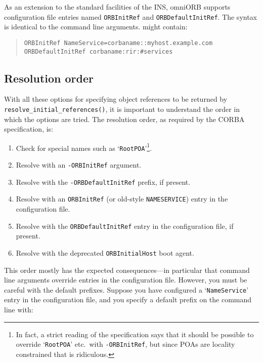 \documentclass[11pt,twoside,a4paper]{book}
\newcommand{\op}[1]{\texttt{#1()}}
\newcommand{\cmdline}[1]{\texttt{#1}}
\newcommand{\file}{\begingroup \urlstyle{tt}\Url}
\newcommand{\dsc}{\discretionary{}{}{}}
\begin{document}
As an extension to the standard facilities of the INS, omniORB
supports configuration file entries named \texttt{ORBInitRef} and
\texttt{ORBDefaultInitRef}. The syntax is identical to the command
line arguments. \file{omniORB.cfg} might contain:

\begin{quote}
\begin{verbatim}
ORBInitRef NameService=corbaname::myhost.example.com
ORBDefaultInitRef corbaname:rir:#services
\end{verbatim}
\end{quote}


\subsection{Resolution order}

With all these options for specifying object references to be returned
by \op{resolve\_\dsc{}initial\_references}, it is important to
understand the order in which the options are tried. The resolution
order, as required by the CORBA specification, is:

\begin{enumerate}

\item Check for special names such as `\texttt{RootPOA}'\footnote{In
fact, a strict reading of the specification says that it should be
possible to override `\texttt{RootPOA}' etc.\ with
\cmdline{-ORBInitRef}, but since POAs are locality constrained that is
ridiculous.}.

\item Resolve with an \cmdline{-ORBInitRef} argument.

\item \label{itm:defaultgotcha} Resolve with the
\cmdline{-ORBDefaultInitRef} prefix, if present.

\item Resolve with an \texttt{ORBInitRef}
(or old-style \texttt{NAMESERVICE}) entry in the configuration file.

\item Resolve with the \texttt{ORBDefaultInitRef} entry in the
configuration file, if present.

\item Resolve with the deprecated \texttt{ORBInitialHost} boot agent.

\end{enumerate}


\noindent This order mostly has the expected consequences---in
particular that command line arguments override entries in the
configuration file.  However, you must be careful with the default
prefixes. Suppose you have configured a `\texttt{NameService}' entry
in the configuration file, and you specify a default prefix on the
command line with:
\end{document}
